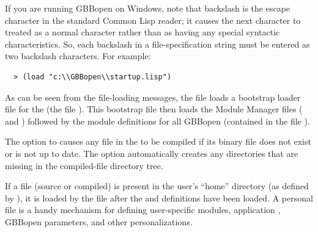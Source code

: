 \documentclass[10pt,twoside,english,pdftex]{article}
\begin{document}
%
%
If you are running GBBopen on Windows, note that backslash is the
escape character in the standard Common Lisp reader; it causes the
next character to treated as a normal character rather than as having
any special syntactic characteristics. So, each backslash in a
file-specification string must be entered as two backslash characters.
For example:
%
\W\supp
\begin{verbatim}
  > (load "c:\\GBBopen\\startup.lisp")
\end{verbatim}
%
As can be seen from the file-loading messages, the 
file loads a bootstrap loader file for the  (the file
).  This
bootstrap file then loads the Module Manager files
( and
) followed by the
module definitions for all GBBopen  (contained in the file
).

%
%
%
The  option to 
causes any file in the  to be compiled if its binary
file does not exist or is not up to date.  The 
option automatically creates any directories that are missing in the
compiled-file directory tree.


%
%
%
%
%
%
If a  file (source or compiled) is present in
the user's ``home'' directory (as defined by
), it is loaded by the
 file after the
 and definitions have
been loaded.  A personal 
file is a handy mechanism for defining user-specific modules, application
, GBBopen parameters, and other personalizations.
\end{document}
